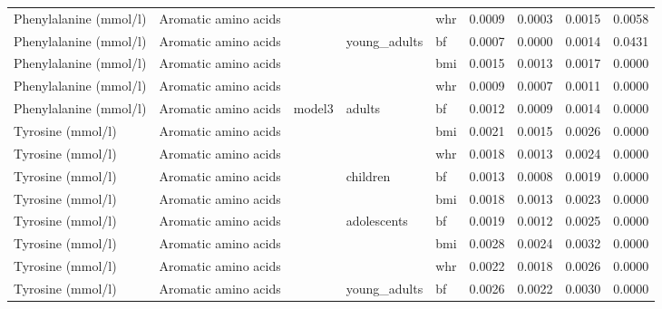 \documentclass[11pt,twoside]{bristolthesis}
\begin{document}
\begin{longtable}[t]{lllllrrrr}
\cmidrule{1-2}
\cmidrule{5-9}\nopagebreak
Phenylalanine (mmol/l) & Aromatic amino acids &  &  & whr & 0.0009 & 0.0003 & 0.0015 & 0.0058\\
\cmidrule{1-2}
\cmidrule{5-9}\nopagebreak
Phenylalanine (mmol/l) & Aromatic amino acids &  & \multirow{-3}{*}{\raggedright\arraybackslash young\_adults} & bf & 0.0007 & 0.0000 & 0.0014 & 0.0431\\
\cmidrule{1-2}
\cmidrule{4-9}\nopagebreak
Phenylalanine (mmol/l) & Aromatic amino acids &  &  & bmi & 0.0015 & 0.0013 & 0.0017 & 0.0000\\
\cmidrule{1-2}
\cmidrule{5-9}\nopagebreak
Phenylalanine (mmol/l) & Aromatic amino acids &  &  & whr & 0.0009 & 0.0007 & 0.0011 & 0.0000\\
\cmidrule{1-2}
\cmidrule{5-9}\nopagebreak
Phenylalanine (mmol/l) & Aromatic amino acids & \multirow{-8}{*}{\raggedright\arraybackslash model3} & \multirow{-3}{*}{\raggedright\arraybackslash adults} & bf & 0.0012 & 0.0009 & 0.0014 & 0.0000\\
\cmidrule{1-9}\pagebreak[0]
Tyrosine (mmol/l) & Aromatic amino acids &  &  & bmi & 0.0021 & 0.0015 & 0.0026 & 0.0000\\
\cmidrule{1-2}
\cmidrule{5-9}\nopagebreak
Tyrosine (mmol/l) & Aromatic amino acids &  &  & whr & 0.0018 & 0.0013 & 0.0024 & 0.0000\\
\cmidrule{1-2}
\cmidrule{5-9}\nopagebreak
Tyrosine (mmol/l) & Aromatic amino acids &  & \multirow{-3}{*}{\raggedright\arraybackslash children} & bf & 0.0013 & 0.0008 & 0.0019 & 0.0000\\
\cmidrule{1-2}
\cmidrule{4-9}\nopagebreak
Tyrosine (mmol/l) & Aromatic amino acids &  &  & bmi & 0.0018 & 0.0013 & 0.0023 & 0.0000\\
\cmidrule{1-2}
\cmidrule{5-9}\nopagebreak
Tyrosine (mmol/l) & Aromatic amino acids &  & \multirow{-2}{*}{\raggedright\arraybackslash adolescents} & bf & 0.0019 & 0.0012 & 0.0025 & 0.0000\\
\cmidrule{1-2}
\cmidrule{4-9}\nopagebreak
Tyrosine (mmol/l) & Aromatic amino acids &  &  & bmi & 0.0028 & 0.0024 & 0.0032 & 0.0000\\
\cmidrule{1-2}
\cmidrule{5-9}\nopagebreak
Tyrosine (mmol/l) & Aromatic amino acids &  &  & whr & 0.0022 & 0.0018 & 0.0026 & 0.0000\\
\cmidrule{1-2}
\cmidrule{5-9}\nopagebreak
Tyrosine (mmol/l) & Aromatic amino acids &  & \multirow{-3}{*}{\raggedright\arraybackslash young\_adults} & bf & 0.0026 & 0.0022 & 0.0030 & 0.0000\\
\cmidrule{1-2}

\end{longtable}
\end{document}
